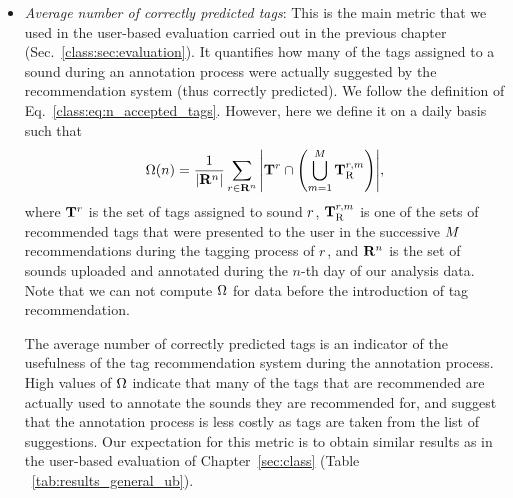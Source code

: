 \begin{itemize}
	\item \textit{Average number of correctly predicted tags}: This is the main metric that we used in the user-based evaluation carried out in the previous chapter (Sec.~\ref{class:sec:evaluation}). It quantifies how many of the tags assigned to a sound during an annotation process were actually suggested by the recommendation system (thus correctly predicted). We follow the definition of Eq.~\ref{class:eq:n_accepted_tags}. However, here we define it on a daily basis such that
\begin{equation} 
\Omega(n) = \frac{1}{|\mathbf{R}^n|} \sum\limits_{r\in \mathbf{R}^n}{\left\vert \mathbf{T}^r \cap \left( \bigcup^{M}_{m=1} \mathbf{T}_{\text{R}}^{r, m} \right) \right\vert}, 
\label{impact:eq:percentage_of_correctly_predicted_tags} \end{equation}
where $\mathbf{T}^r$ is the set of tags assigned to sound $r$, 
$\mathbf{T}_{\text{R}}^{r, m}$ is one of the sets of recommended tags that were presented to the user in the successive $M$ recommendations during the tagging process of $r$, and $\mathbf{R}^n$ is the set of sounds uploaded and annotated during the $n$-th day of our analysis data. Note that we can not compute $\Omega$ for data before the introduction of tag recommendation. 

The average number of correctly predicted tags is an indicator of the usefulness of the tag recommendation system during the annotation process. High values of $\Omega$ indicate that many of the tags that are recommended are actually used to annotate the sounds they are recommended for, and suggest that the annotation process is less costly as tags are taken from the list of suggestions. Our expectation for this metric is to obtain similar results as in the user-based evaluation of Chapter~\ref{sec:class} (Table ~\ref{tab:results_general_ub}). %


\end{itemize}


